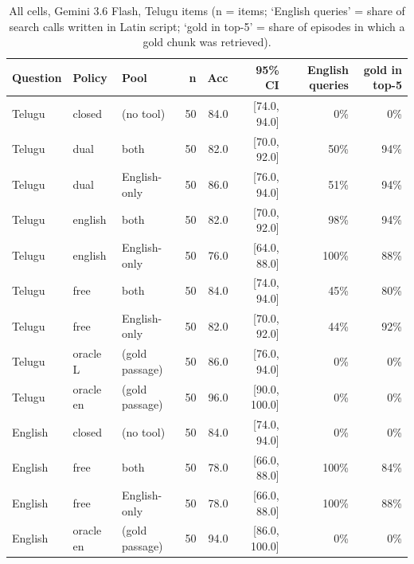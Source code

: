 \begin{table}[htbp]\centering\scriptsize
\begin{tabular}{lllrrrrr}
\toprule
Question & Policy & Pool & n & Acc & 95\% CI & English queries & gold in top-5 \\
\midrule
Telugu & closed & (no tool) & 50 & 84.0 & [74.0, 94.0] & 0\% & 0\% \\
Telugu & dual & both & 50 & 82.0 & [70.0, 92.0] & 50\% & 94\% \\
Telugu & dual & English-only & 50 & 86.0 & [76.0, 94.0] & 51\% & 94\% \\
Telugu & english & both & 50 & 82.0 & [70.0, 92.0] & 98\% & 94\% \\
Telugu & english & English-only & 50 & 76.0 & [64.0, 88.0] & 100\% & 88\% \\
Telugu & free & both & 50 & 84.0 & [74.0, 94.0] & 45\% & 80\% \\
Telugu & free & English-only & 50 & 82.0 & [70.0, 92.0] & 44\% & 92\% \\
Telugu & oracle L & (gold passage) & 50 & 86.0 & [76.0, 94.0] & 0\% & 0\% \\
Telugu & oracle en & (gold passage) & 50 & 96.0 & [90.0, 100.0] & 0\% & 0\% \\
English & closed & (no tool) & 50 & 84.0 & [74.0, 94.0] & 0\% & 0\% \\
English & free & both & 50 & 78.0 & [66.0, 88.0] & 100\% & 84\% \\
English & free & English-only & 50 & 78.0 & [66.0, 88.0] & 100\% & 88\% \\
English & oracle en & (gold passage) & 50 & 94.0 & [86.0, 100.0] & 0\% & 0\% \\
\bottomrule
\end{tabular}
\caption{All cells, Gemini 3.6 Flash, Telugu items (n = items; `English queries' = share of search calls written in Latin script; `gold in top-5' = share of episodes in which a gold chunk was retrieved).}
\end{table}

